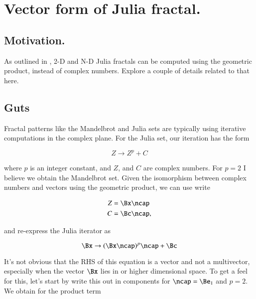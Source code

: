 %
%

\chapter{Vector form of Julia fractal.}
\label{chap:juliaVector}
{}
\date{Dec 27, 2010}

\beginArtNoToc

\section{Motivation.}

As outlined in \citep{dorst2007gac}, 2-D and N-D Julia fractals can be computed using the geometric product, instead of complex numbers.  Explore a couple of details related to that here.

\section{Guts}

Fractal patterns like the Mandelbrot and Julia sets are typically using iterative computations in the complex plane.  For the Julia set, our iteration has the form

\begin{equation}\label{eqn:juliaFractal:10}
Z \rightarrow Z^p + C
\end{equation}

where $p$ is an integer constant, and $Z$, and $C$ are complex numbers.  For $p=2$ I believe we obtain the Mandelbrot set.  Given the isomorphism between complex numbers and vectors using the geometric product, we can use write

\begin{align}\label{eqn:juliaFractal:20}
Z &= \Bx \ncap \\
C &= \Bc \ncap,
\end{align}

and re-express the Julia iterator as

\begin{equation}\label{eqn:juliaFractal:30}
\Bx \rightarrow (\Bx \ncap)^p \ncap + \Bc
\end{equation}

It's not obvious that the RHS of this equation is a vector and not a multivector, especially when the vector $\Bx$ lies in  or higher dimensional space.  To get a feel for this, let's start by write this out in components for $\ncap = \Be_1$ and $p=2$.  We obtain for the product term

